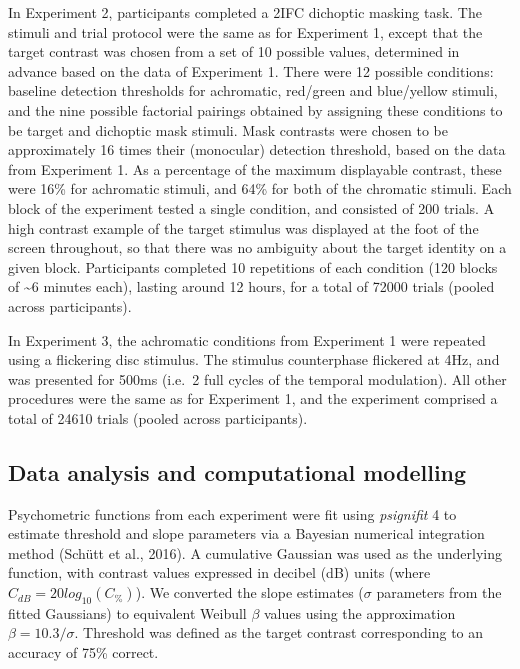 \documentclass[
  letterpaper,
  DIV=11,
  numbers=noendperiod]{scrartcl}
\begin{document}
In Experiment 2, participants completed a 2IFC dichoptic masking task.
The stimuli and trial protocol were the same as for Experiment 1, except
that the target contrast was chosen from a set of 10 possible values,
determined in advance based on the data of Experiment 1. There were 12
possible conditions: baseline detection thresholds for achromatic,
red/green and blue/yellow stimuli, and the nine possible factorial
pairings obtained by assigning these conditions to be target and
dichoptic mask stimuli. Mask contrasts were chosen to be approximately
16 times their (monocular) detection threshold, based on the data from
Experiment 1. As a percentage of the maximum displayable contrast, these
were 16\% for achromatic stimuli, and 64\% for both of the chromatic
stimuli. Each block of the experiment tested a single condition, and
consisted of 200 trials. A high contrast example of the target stimulus
was displayed at the foot of the screen throughout, so that there was no
ambiguity about the target identity on a given block. Participants
completed 10 repetitions of each condition (120 blocks of
\textasciitilde6 minutes each), lasting around 12 hours, for a total of
72000 trials (pooled across participants).

In Experiment 3, the achromatic conditions from Experiment 1 were
repeated using a flickering disc stimulus. The stimulus counterphase
flickered at 4Hz, and was presented for 500ms (i.e.~2 full cycles of the
temporal modulation). All other procedures were the same as for
Experiment 1, and the experiment comprised a total of 24610 trials
(pooled across participants).

\hypertarget{data-analysis-and-computational-modelling}{%
\subsection{Data analysis and computational
modelling}\label{data-analysis-and-computational-modelling}}

Psychometric functions from each experiment were fit using
\emph{psignifit} 4 to estimate threshold and slope parameters via a
Bayesian numerical integration method (Schütt et al., 2016). A
cumulative Gaussian was used as the underlying function, with contrast
values expressed in decibel (dB) units (where
\(C_{dB} = 20log_{10}(C_\%)\)). We converted the slope estimates
(\(\sigma\) parameters from the fitted Gaussians) to equivalent Weibull
\(\beta\) values using the approximation \(\beta = 10.3/\sigma\).
Threshold was defined as the target contrast corresponding to an
accuracy of 75\% correct.
\end{document}
